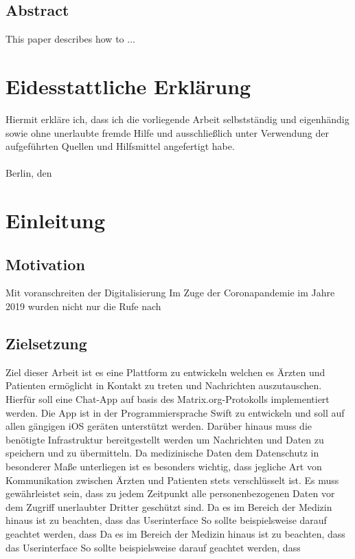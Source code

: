     \section*{Abstract}\label{sec:abstract}
    This paper describes how to ...
    \newpage
    \chapter*{Eidesstattliche Erklärung}\label{ch:eidesstattliche-erklarung}
    Hiermit erkläre ich, dass ich die vorliegende Arbeit selbstständig und eigenhändig sowie ohne
    unerlaubte fremde Hilfe und ausschließlich unter Verwendung der aufgeführten Quellen und
    Hilfsmittel angefertigt habe.\\
    \vspace{1cm}\\
    Berlin, den \underline{\hspace{3cm}} \hfill \DeinName \underline{\hspace{4cm}}

    \newpage
    \tableofcontents

    \mainmatter

    \newpage
    \chapter{Einleitung}\label{ch:einleitung}

    \section{Motivation}\label{sec:motivation}
    Mit voranschreiten der Digitalisierung
    Im Zuge der Coronapandemie im Jahre 2019 wurden nicht nur die Rufe nach

    \section{Zielsetzung}\label{sec:zielsetzung}
    Ziel dieser Arbeit ist es eine Plattform zu entwickeln welchen es Ärzten und Patienten ermöglicht in Kontakt zu treten und Nachrichten auszutauschen.
    Hierfür soll eine Chat-App auf basis des Matrix.org-Protokolls implementiert werden.
    Die App ist in der Programmiersprache Swift zu entwickeln und soll auf allen gängigen iOS geräten unterstützt werden.
    Darüber hinaus muss die benötigte Infrastruktur bereitgestellt werden um Nachrichten und Daten zu speichern und zu übermitteln.
    Da medizinische Daten dem Datenschutz in besonderer Maße unterliegen ist es besonders wichtig,
    dass jegliche Art von Kommunikation zwischen Ärzten und Patienten stets verschlüsselt ist.
    Es muss gewährleistet sein, dass zu jedem Zeitpunkt alle personenbezogenen Daten vor dem Zugriff unerlaubter Dritter geschützt sind.
    Da es im Bereich der Medizin  hinaus ist zu beachten, dass das Userinterface
    So sollte beispielsweise darauf geachtet werden, dass Da es im Bereich der Medizin hinaus ist zu beachten, dass das Userinterface
    So sollte beispielsweise darauf geachtet werden, dass

